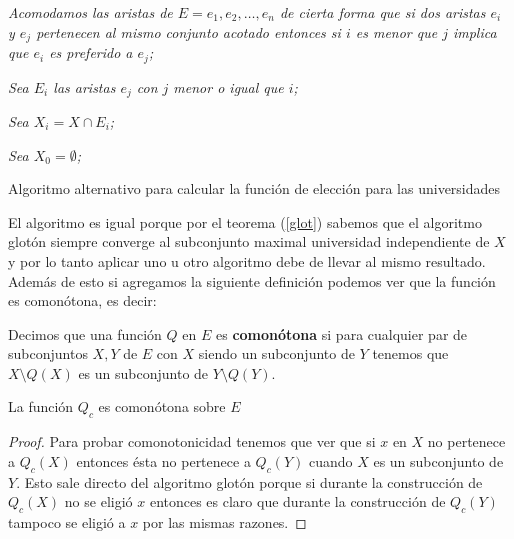 \IncMargin{1em}
\begin{Algoritmo}[H]

\BlankLine
\emph{Acomodamos las aristas de $E=e_1,e_2,\dots,e_n$ de cierta forma que si dos aristas $e_i$ y $e_j$ pertenecen al mismo conjunto acotado entonces si $i$ es menor que $j$ implica que $e_i$ es preferido a $e_j$;}

\emph{Sea $E_i$ las aristas $e_j$ con $j$ menor o igual que $i$;}

\emph{Sea $X_i=X \cap E_i$;}

\emph{Sea $X_0 = \emptyset$;}


\caption{Algoritmo alternativo para calcular la función de elección para las universidades}
\end{Algoritmo}
\DecMargin{1em}

El algoritmo es igual porque por el teorema (\ref{glot}) sabemos que el algoritmo glotón siempre converge al subconjunto maximal universidad independiente de $X$ y por lo tanto aplicar uno u otro algoritmo debe de llevar al mismo resultado. Además de esto si agregamos la siguiente definición podemos ver que la función es comonótona, es decir:

\begin{dfn}
Decimos que una función $Q$ en $E$ es \textbf{comonótona} si para cualquier par de subconjuntos $X,Y$ de $E$ con $X$ siendo un subconjunto de $Y$ tenemos que $X\setminus Q(X)$ es un subconjunto de $Y\setminus Q(Y)$.
\end{dfn}

\begin{cor}
La función $Q_c$ es comonótona sobre $E$
\end{cor}

\begin{proof}
Para probar comonotonicidad tenemos que ver que si $x$ en $X$ no pertenece a $Q_c(X)$ entonces ésta no pertenece a $Q_c(Y)$ cuando $X$ es un subconjunto de $Y$. Esto sale directo del algoritmo glotón porque si durante la construcción de $Q_c(X)$ no se eligió $x$ entonces es claro que durante la construcción de $Q_c(Y)$ tampoco se eligió a $x$ por las mismas razones. 
\end{proof}

